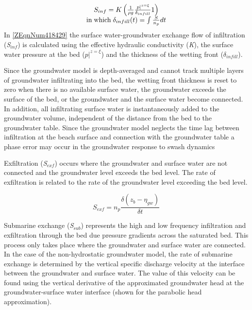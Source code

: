 \documentclass{article}
\begin{document}
\noindent 
\begin{equation} \label{ZEqnNum418429} 
\begin{array}{c} {S_{inf} =K\left(\frac{1}{\rho g} \frac{\left. p\right|^{z=\xi } }{\delta _{infill} } 1\right)} \\ {{\rm in\; which\; }\delta _{infill} (t)=\int \frac{S}{n_{p} } dt } \end{array} 
\end{equation} 
In \eqref{ZEqnNum418429} the surface water-groundwater exchange flow of infiltration (\textit{S${}_{inf}$}) is calculated using the effective hydraulic conductivity (\textit{K}), the surface water pressure at the bed ($\left. p\right|^{z=\xi } $) and the thickness of the wetting front (\textit{$\delta _{infill} $}).

\noindent 

\noindent Since the groundwater model is depth-averaged and cannot track multiple layers of groundwater infiltrating into the bed, the wetting front thickness is reset to zero when there is no available surface water, the groundwater exceeds the surface of the bed, or the groundwater and the surface water become connected. In addition, all infiltrating surface water is instantaneously added to the groundwater volume, independent of the distance from the bed to the groundwater table. Since the groundwater model neglects the time lag between infiltration at the beach surface and connection with the groundwater table a phase error may occur in the groundwater response to swash dynamics

\noindent 

\noindent Exfiltration (\textit{S${}_{exf}$}) occurs where the groundwater and surface water are not connected and the groundwater level exceeds the bed level. The rate of exfiltration is related to the rate of the groundwater level exceeding the bed level.

\noindent 
\begin{equation} \label{2.71)} 
S_{exf} =n_{p} \frac{\delta (z_{b} -\eta _{gw} )}{\delta t}  
\end{equation} 


\noindent Submarine exchange (\textit{S${}_{sub}$}) represents the high and low frequency infiltration and exfiltration through the bed due pressure gradients across the saturated bed. This process only takes place where the groundwater and surface water are connected. In the case of the non-hydrostatic groundwater model, the rate of submarine exchange is determined by the vertical specific discharge velocity at the interface between the groundwater and surface water. The value of this velocity can be found using the vertical derivative of the approximated groundwater head at the groundwater-surface water interface (shown for the parabolic head approximation).
\end{document}
